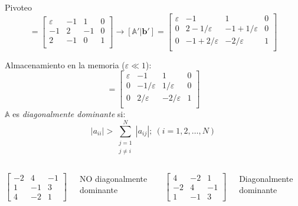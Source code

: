 \documentclass[9pt, aspectratio=169]{beamer}
\begin{document}
\begin{frame}{Pivoteo}
\begin{equation*} [\mathbb{A} | \mathbf{b}] = 
  \left[
  \begin{array}{ccc|c}
    \varepsilon & -1 & 1 & 0 \\
    -1 & 2 & -1 & 0 \\
    2 & -1 & 0 & 1\\
  \end{array} \right]
 \rightarrow [\mathbb{A'} | \mathbf{b'}] = 
    \left[ 
    \begin{array}{ccc|c}
    \varepsilon & -1 & 1 & 0 \\
    0 & 2-1/\varepsilon & -1+1/\varepsilon & 0 \\
    0 & -1+2/\varepsilon & -2/\varepsilon  & 1\\
    \end{array} \right] 
\end{equation*} \pause

Almacenamiento en la memoria ($\varepsilon \ll 1$):
\begin{equation*}
 [\mathbb{A'} | \mathbf{b'}] = 
    \left[ 
    \begin{array}{ccc|c}
    \varepsilon & -1 & 1 & 0 \\
    0 & -1/\varepsilon & 1/\varepsilon & 0 \\
    0 & 2/\varepsilon & -2/\varepsilon  & 1\\
    \end{array} \right] 
\end{equation*} \pause
$\mathbb{A}$ es \textit{diagonalmente dominante} si:
\[ |a_{ii}| > \sum_{\substack{j=1 \\j \neq i}}^N |a_{ij}|; \> (i = 1, 2, \ldots, N)  \]
\vspace{-0.1cm}
\begin{columns}
 \column{5cm}
 \begin{equation*}
  \left[ \begin{array}{ccc}
          -2 & 4 & -1 \\
          1 & -1 & 3 \\
          4 & -2 & 1
         \end{array} \right]
 \end{equation*}
 \begin{center}
  {\small NO diagonalmente dominante}
 \end{center}
 \column{5cm}
 \begin{equation*}
  \left[ \begin{array}{ccc}
          4 & -2 & 1 \\
          -2 & 4 & -1 \\
          1 & -1 & 3 
         \end{array} \right]
 \end{equation*}
 \begin{center}
  {\small Diagonalmente dominante}
 \end{center}
 \end{columns}
\end{frame}
\end{document}
